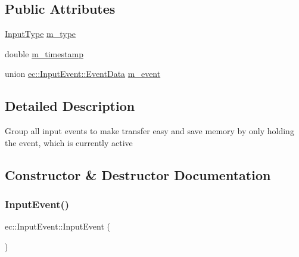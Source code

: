 \subsection*{Public Attributes}
\begin{DoxyCompactItemize}
\item 
\mbox{\hyperlink{namespaceec_a5de6bdb8c4b2ed6e590e721ec998f964}{Input\+Type}} \mbox{\hyperlink{structec_1_1_input_event_a07aadaf18da2952478b803bbd4122bb7}{m\+\_\+type}}
\item 
double \mbox{\hyperlink{structec_1_1_input_event_ada54908facf585cb714bd6712d8f6c4d}{m\+\_\+timestamp}}
\item 
union \mbox{\hyperlink{unionec_1_1_input_event_1_1_event_data}{ec\+::\+Input\+Event\+::\+Event\+Data}} \mbox{\hyperlink{structec_1_1_input_event_a8d146eaa61615d0e9f680f68d920835c}{m\+\_\+event}}
\end{DoxyCompactItemize}


\subsection{Detailed Description}
Group all input events to make transfer easy and save memory by only holding the event, which is currently active 

\subsection{Constructor \& Destructor Documentation}
\mbox{\label{structec_1_1_input_event_a0e1dd98eb4e1161bdb573afe429d07c8}} 
\subsubsection{\texorpdfstring{Input\+Event()}{InputEvent()}\hspace{0.1cm}{\footnotesize\ttfamily [1/2]}}
{\footnotesize\ttfamily ec\+::\+Input\+Event\+::\+Input\+Event (\begin{DoxyParamCaption}{ }\end{DoxyParamCaption})\hspace{0.3cm}{\ttfamily [explicit]}}

\mbox{\label{structec_1_1_input_event_ae7dd00fad1ba770de42ba5b7e977bc79}} 
